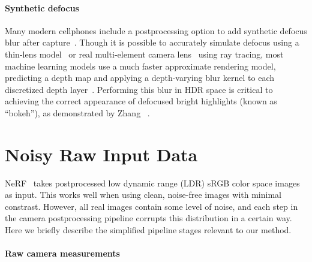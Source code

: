 \paragraph{Synthetic defocus} Many modern cellphones include a postprocessing option to add synthetic defocus blur after capture~\cite{wadhwa2018defocus}. Though it is possible to accurately simulate defocus using a thin-lens model~\cite{cook1984distributed} or real multi-element camera lens~\cite{lenstracing} using ray tracing, most machine learning models use a much faster approximate rendering model, predicting a depth map and applying a depth-varying blur kernel to each discretized depth layer~\cite{barron2015stereo,srinivasan2018aperture}. Performing this blur in HDR space is critical to achieving the correct appearance of defocused bright highlights (known as ``bokeh''), as demonstrated by Zhang \etal~\cite{zhang2019defocus}.





















\section{Noisy Raw Input Data}
\label{sec:isp}

NeRF~\cite{mildenhall2020nerf} takes postprocessed low dynamic range (LDR) sRGB color space images as input. This works well when using clean, noise-free images with minimal constrast. However, all real images contain some level of noise, and each step in the camera postprocessing pipeline corrupts this distribution in a certain way.
Here we briefly describe the simplified pipeline stages relevant to our method. 









\paragraph{Raw camera measurements}

